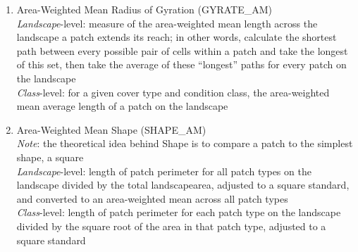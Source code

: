 \begin{itemize}
\begin{enumerate}
		\item Area-Weighted Mean Radius of Gyration (GYRATE\_AM)\\
		\emph{Landscape}-level: measure of the area-weighted mean length across the landscape a patch extends its reach; in other words, calculate the shortest path between every possible pair of cells within a patch and take the longest of this set, then take the average of these ``longest'' paths for every patch on the landscape\\
		\emph{Class}-level: for a given cover type and condition class, the area-weighted mean average length of a patch on the landscape\\
		
		
		\item Area-Weighted Mean Shape (SHAPE\_AM)\\
		\emph{Note}: the theoretical idea behind Shape is to compare a patch to the simplest shape, a square 		\\
		\emph{Landscape}-level: length of patch perimeter for all patch types on the landscape divided by the total landscapearea, adjusted to a square standard, and converted to an area-weighted mean across all patch types \\
		\emph{Class}-level: length of patch perimeter for each patch type on the landscape divided by the square root of the area in that patch type, adjusted to a square standard\\
		
		

\end{enumerate}
\end{itemize}

